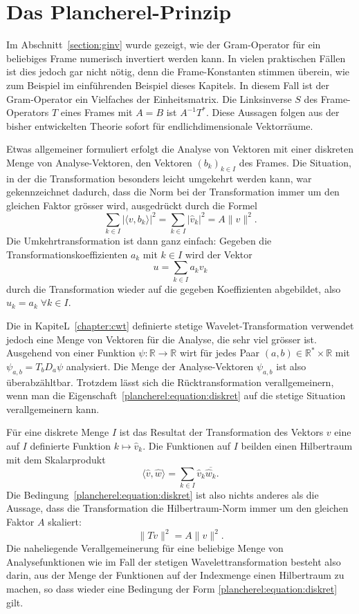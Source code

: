 %
%
%
\section{Das Plancherel-Prinzip
\label{section:plancherel}}
Im Abschnitt~\ref{section:ginv} wurde gezeigt, wie der Gram-Operator
für ein beliebiges Frame numerisch invertiert werden kann.
In vielen praktischen Fällen ist dies jedoch gar nicht nötig, denn
die Frame-Konstanten stimmen überein, wie zum Beispiel im einführenden
Beispiel dieses Kapitels.
In diesem Fall ist der Gram-Operator ein Vielfaches der Einheitsmatrix.
Die Linksinverse $S$ des Frame-Operators $T$ eines Frames mit $A=B$
ist $A^{-1}T^*$.
Diese Aussagen folgen aus der bisher entwickelten Theorie sofort
für endlichdimensionale Vektorräume.

Etwas allgemeiner formuliert erfolgt die Analyse von Vektoren
mit einer diskreten Menge von Analyse-Vektoren, den Vektoren $(b_k)_{k\in I}$
des Frames.
Die Situation, in der die Transformation besonders leicht umgekehrt werden
kann, war gekennzeichnet dadurch, dass die Norm bei der Transformation
immer um den gleichen Faktor grösser wird,
ausgedrückt durch die Formel
\begin{equation}
\sum_{k\in I} |\langle v,b_k\rangle|^2
=
\sum_{k\in I} |\hat{v}_k|^2
=
A\| v\|^2.
\label{plancherel:equation:diskret}
\end{equation}
Die Umkehrtransformation ist dann ganz einfach:
Gegeben die Transformationskoeffizienten $a_k$ mit $k\in I$ wird der Vektor
\[
u = \sum_{k\in I} a_k v_k
\]
durch die Transformation wieder auf die gegeben Koeffizienten abgebildet,
also $\hat{u}_k = a_k\;\forall k\in I$.

Die in KapiteL~\ref{chapter:cwt} definierte stetige Wavelet-Transformation
verwendet jedoch eine Menge von Vektoren für die Analyse, die sehr viel
grösser ist.
Ausgehend von einer Funktion $\psi\colon\mathbb R\to\mathbb R$
wirt für jedes Paar $(a,b)\in \mathbb{R}^*\times \mathbb R$ mit
$\psi_{a,b}=T_bD_a\psi$ analysiert.
Die Menge der Analyse-Vektoren $\psi_{a,b}$ ist also überabzähltbar.
Trotzdem lässt sich die Rücktransformation verallgemeinern, wenn 
man die Eigenschaft~\eqref{plancherel:equation:diskret} auf die
stetige Situation verallgemeinern kann.

Für eine diskrete Menge $I$ ist das Resultat der Transformation des Vektors
$v$ eine auf $I$ definierte Funktion $k\mapsto \hat{v}_k$.
Die Funktionen auf $I$ beilden einen Hilbertraum mit dem Skalarprodukt
\[
\langle \hat{v},\hat{w}\rangle
=
\sum_{k\in I} \hat{v}_k \overline{\hat{w}_k}.
\]
Die Bedingung~\eqref{plancherel:equation:diskret} ist also nichts anderes
als die Aussage, dass die Transformation die Hilbertraum-Norm immer um
den gleichen Faktor $A$ skaliert:
\[
\| Tv \|^2 = A \| v\|^2.
\]
Die naheliegende Verallgemeinerung für eine beliebige Menge von
Analysefunktionen wie im Fall der stetigen Wavelettransformation
besteht also darin, aus der Menge der Funktionen auf der Indexmenge
einen Hilbertraum zu machen, so dass wieder eine Bedingung der Form
\eqref{plancherel:equation:diskret} gilt.

